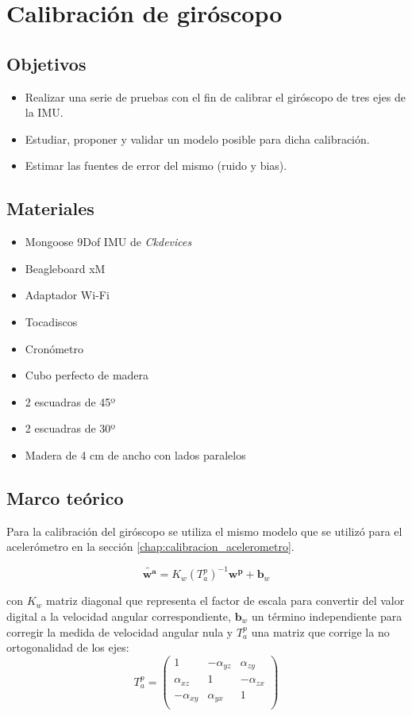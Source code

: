 \documentclass[main]{subfiles}
\begin{document}
\chapter{Calibración de giróscopo}

\section{Objetivos}

\begin{itemize}
	\item Realizar una serie de pruebas con el fin de calibrar el giróscopo de tres ejes de la IMU.
	\item Estudiar, proponer y validar un modelo posible para dicha calibración.
	\item Estimar las fuentes de error del mismo (ruido y bias).
\end{itemize}

\section{Materiales}
\begin{itemize}
\item Mongoose 9Dof IMU de \emph{Ckdevices}
\item Beagleboard xM
\item Adaptador Wi-Fi 
\item Tocadiscos
\item Cronómetro
\item Cubo perfecto de madera
\item 2 escuadras de 45º
\item 2 escuadras de 30º
\item Madera de 4 cm de ancho con lados paralelos
\end{itemize}

\section{Marco teórico}
Para la calibración del giróscopo se utiliza el mismo modelo que se utilizó para el acelerómetro en la sección \ref{chap:calibracion_acelerometro}.

\begin{equation}
\tilde{\mathbf{w^a}}=K_w(T_a^p)^{-1}\mathbf{w^p}+\mathbf{b}_w
\label{ec:modelo_gyro}
\end{equation}

con $K_w$ matriz diagonal que representa el factor de escala para convertir del valor digital a la velocidad angular correspondiente, $\mathbf{b}_w$ un término independiente para corregir la medida de velocidad angular nula y $T^p_a$ una matriz que corrige la no ortogonalidad de los ejes:
$$T^p_a=\left( 
\begin{matrix}
1 &-\alpha_{yz} &\alpha_{zy}\\
\alpha_{xz} &1& -\alpha_{zx} \\
-\alpha_{xy} &\alpha_{yx} &1\\
\end{matrix} 
\right)$$
\end{document}
